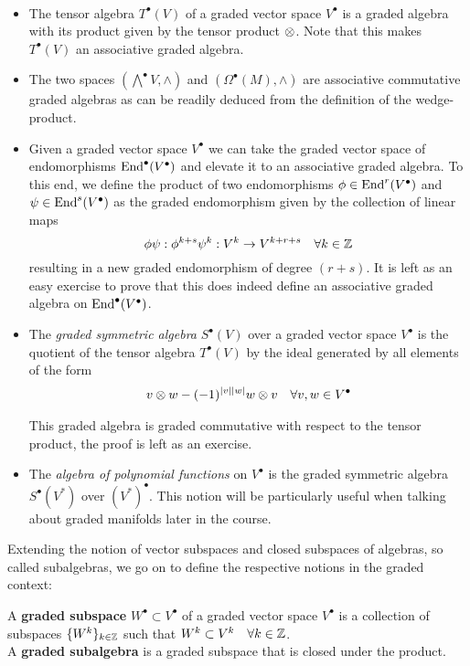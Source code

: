 \begin{example}~
\begin{itemize}
  \item The tensor algebra $T^\bullet(V)$ of a graded vector space $V^\bullet$ is a graded algebra with its product given by the tensor product $\mathbin{\mathop{\otimes}\displaylimits_{}}$. Note that this makes $T^\bullet(V)$ an associative graded algebra.

  \item The two spaces $(\bigwedge^\bullet V, \wedge)$ and $(\Omega^\bullet(M), \wedge)$ are associative commutative graded algebras as can be readily deduced from the definition of the wedge-product.

  \item Given a graded vector space $V^\bullet$ we can take the graded vector space of endomorphisms $\operatorname{End}^\bullet(V^\bullet)$  and elevate it to an associative graded algebra. To this end, we define the product of two endomorphisms $\phi \in \End^r(V^\bullet)$ and $\psi \in \operatorname{End}^s(V^\bullet)$ as the graded endomorphism given by the collection of linear maps
  $$ \phi \psi : \phi^{k+s}\psi^k: V^k \ra V^{k+r+s}\quad \forall k\in \ZZ $$
  resulting in a new graded endomorphism of degree $(r+s)$. It is left as an easy exercise to prove that this does indeed define an associative graded algebra on $\operatorname{End}^\bullet(V^\bullet)$.

  \item The \emph{graded symmetric algebra} $S^\bullet(V)$ over a graded vector space $V^\bullet$ is the quotient of the tensor algebra $T^\bullet(V)$ by the ideal generated by all elements of the form
  $$ v\mathbin{\mathop{\otimes}\displaylimits_{}}w - (-1)^{|v||w|} w \mathbin{\mathop{\otimes}\displaylimits_{}}v \quad \forall v,w \in V^\bullet $$
  This graded algebra is graded commutative with respect to the tensor product, the proof is left as an exercise.

 \item The \emph{algebra of polynomial functions} on $V^\bullet$ is the graded symmetric algebra $S^\bullet(V^*)$ over $(V^*)^\bullet$. This notion will be particularly useful when talking about graded manifolds later in the course.
\end{itemize}
\end{example}

Extending the notion of vector subspaces and closed subspaces of algebras, so called subalgebras, we go on to define the respective notions in the graded context:

\begin{definition}
  A \textbf{graded subspace} $W^\bullet \subset V^\bullet$ of a graded vector space $V^\bullet$ is a collection of subspaces $\{ W^k \}_{k\in\mathbb{Z}}$ such that $W^k \subset V^k \quad \forall k \in \mathbb{Z}$.\\
  A \textbf{graded subalgebra} is a graded subspace that is closed under the product.
\end{definition}

